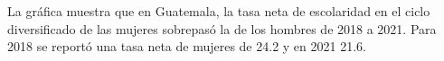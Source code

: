 La gráfica muestra que en Guatemala, la tasa neta de escolaridad en el ciclo diversificado de las mujeres sobrepasó la de los hombres de 2018 a 2021. Para 2018 se reportó una tasa neta de mujeres de 24.2 y en 2021 21.6. 